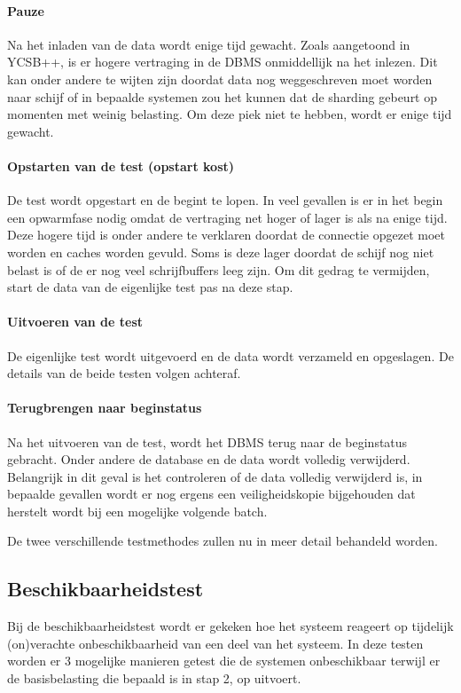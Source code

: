 \paragraph{Pauze} Na het inladen van de data wordt enige tijd gewacht. Zoals aangetoond in YCSB++\cite[Figuur 9]{patil2011ycsb++}, is er hogere vertraging in de DBMS onmiddellijk na het inlezen. Dit kan onder andere te wijten zijn doordat data nog weggeschreven moet worden naar schijf of in bepaalde systemen zou het kunnen dat de sharding gebeurt op momenten met weinig belasting. Om deze piek niet te hebben, wordt er enige tijd gewacht. 

\paragraph{Opstarten van de test (opstart kost)} De test wordt opgestart en de begint te lopen. In veel gevallen is er in het begin een opwarmfase nodig omdat de vertraging net hoger of lager is als na enige tijd. Deze hogere tijd is onder andere te verklaren doordat de connectie opgezet moet worden en caches worden gevuld. Soms is deze lager doordat de schijf nog niet belast is of de er nog veel schrijfbuffers leeg zijn. Om dit gedrag te vermijden, start de data van de eigenlijke test pas na deze stap. 

\paragraph{Uitvoeren van de test} De eigenlijke test wordt uitgevoerd en de data wordt verzameld en opgeslagen. De details van de beide testen volgen achteraf. 

\paragraph{Terugbrengen naar beginstatus} Na het uitvoeren van de test, wordt het DBMS terug naar de beginstatus gebracht. Onder andere de database en de data wordt volledig verwijderd. Belangrijk in dit geval is het controleren of de data volledig verwijderd is, in bepaalde gevallen wordt er nog ergens een veiligheidskopie bijgehouden dat herstelt wordt bij een mogelijke volgende batch. 

De twee verschillende testmethodes zullen nu in meer detail behandeld worden. 
\subsection{Beschikbaarheidstest}
Bij de beschikbaarheidstest wordt er gekeken hoe het systeem reageert op tijdelijk (on)verachte onbeschikbaarheid van een deel van het systeem. In deze testen worden er 3 mogelijke manieren getest die de systemen onbeschikbaar terwijl er de basisbelasting die bepaald is in stap 2, op uitvoert. 

